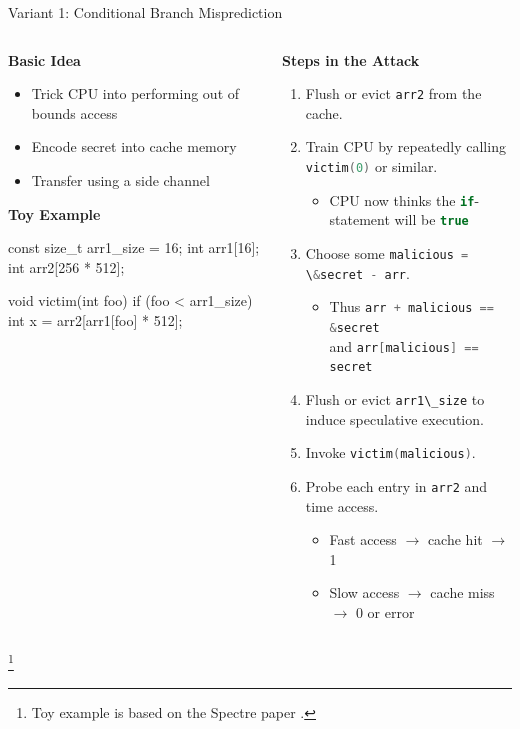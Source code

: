 \documentclass[10pt, dvipsnames, aspectratio=169]{beamer}
\newcommand\ufootnote[1]{%
    \begingroup
        \renewcommand\thefootnote{}\footnote{\hspace{-1.8em}#1}%
        \addtocounter{footnote}{-1}%
    \endgroup
}
\let\lsi\lstinline
\newcommand{\code}[1]{\lsi[language=c]|#1|}
\begin{document}
\begin{frame}[c, fragile]{Variant 1: Conditional Branch Misprediction}
  \begin{columns}
    \begin{column}[t]{0.35\textwidth}
      {\bf Basic Idea}
      \begin{itemize}
        \item Trick CPU into performing out of bounds access
        \item Encode secret into cache memory
        \item Transfer using a side channel
      \end{itemize}

      \vspace{0.5em}
      {\bf Toy Example}
      \begin{listing}[language=c,gobble=8,xleftmargin=1em]
        const size_t arr1_size = 16;
        int arr1[16];
        int arr2[256 * 512];

        void victim(int foo) {
            if (foo < arr1_size) {
                int x = arr2[arr1[foo] * 512];
            }
        }
      \end{listing}
    \end{column}

    \begin{column}[t]{0.65\textwidth}
      {\bf Steps in the Attack}
      \begin{enumerate}
        \item Flush or evict \code{arr2} from the cache.
        \item Train CPU by repeatedly calling \code{victim(0)} or similar.
        \begin{itemize}
          \item CPU now thinks the \code{if}-statement will be \code{true}
        \end{itemize}
        \item Choose some \code{malicious = \&secret - arr}.
        \begin{itemize}
          \item Thus \code{arr + malicious == &secret} \\
                and \code{arr[malicious] == secret}
        \end{itemize}
        \item Flush or evict \code{arr1\_size} to induce speculative execution.
        \item Invoke \code{victim(malicious)}.
        \item Probe each entry in \code{arr2} and time access.
        \begin{itemize}
          \item Fast access $\rightarrow$ cache hit $\rightarrow$ 1
          \item Slow access $\rightarrow$ cache miss $\rightarrow$ 0 or error
        \end{itemize}
      \end{enumerate}
    \end{column}
  \end{columns}
  \ufootnote{Toy example is based on the Spectre paper \cite{kocher2019_spectre}.}
\end{frame}
\end{document}
